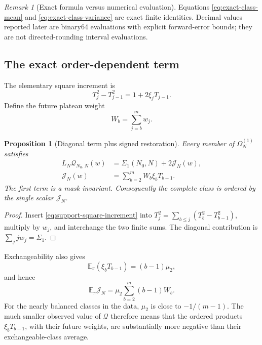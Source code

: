 \documentclass[11pt,reqno]{amsart}
\numberwithin{equation}{section}
\theoremstyle{plain}
\newtheorem{proposition}[theorem]{Proposition}
\theoremstyle{definition}
\theoremstyle{remark}
\newtheorem{remark}[theorem]{Remark}
\newcommand{\E}{\mathbb E}
\newcommand{\Om}{\Omega}
\newcommand{\QF}{\mathcal Q}
\begin{document}
\begin{remark}[Exact formula versus numerical evaluation]
\label{rem:exact-versus-binary64}
Equations \eqref{eq:exact-class-mean} and
\eqref{eq:exact-class-variance} are exact finite identities.  Decimal values
reported later are binary64 evaluations with explicit forward-error bounds;
they are not directed-rounding interval evaluations.
\end{remark}

\subsection{The exact order-dependent term}
\label{subsec:order-dependent-term}

The elementary square increment is
\begin{equation}
T_j^2-T_{j-1}^2=1+2\xi_jT_{j-1}.
\label{eq:support-square-increment}
\end{equation}
Define the future plateau weight
\begin{equation}
W_b=\sum_{j=b}^{m}w_j.
\label{eq:future-plateau-weight}
\end{equation}

\begin{proposition}[Diagonal term plus signed restoration]
\label{prop:diagonal-restoration}
Every member of \(\Om_N^{(1)}\) satisfies
\begin{align}
L_N\QF_{N_0,N}(w)
&=\Sigma_1(N_0,N)+2\mathcal J_N(w),
\label{eq:diagonal-restoration}\\
\mathcal J_N(w)
&=\sum_{b=2}^{m}W_b\xi_bT_{b-1}.
\label{eq:restoration-functional}
\end{align}
The first term is a mask invariant.  Consequently the complete class is
ordered by the single scalar \(\mathcal J_N\).
\end{proposition}

\begin{proof}
Insert \eqref{eq:support-square-increment} into
\(T_j^2=\sum_{b\leq j}(T_b^2-T_{b-1}^2)\), multiply by \(w_j\), and interchange
the two finite sums.  The diagonal contribution is
\(\sum_jjw_j=\Sigma_1\).
\end{proof}

Exchangeability also gives
\begin{equation}
\E_{\pi}(\xi_bT_{b-1})=(b-1)\mu_2,
\label{eq:expected-restoration-step}
\end{equation}
and hence
\begin{equation}
\E_{\pi}\mathcal J_N
=\mu_2\sum_{b=2}^{m}(b-1)W_b.
\label{eq:expected-restoration-functional}
\end{equation}
For the nearly balanced classes in the data, \(\mu_2\) is close to
\(-1/(m-1)\).  The much smaller observed value of \(\QF\) therefore means
that the ordered products \(\xi_bT_{b-1}\), with their future weights, are
substantially more negative than their exchangeable-class average.
\end{document}

